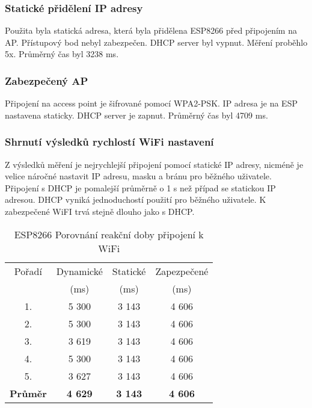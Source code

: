 \documentclass[a4paper, 12pt]{report}
\begin{document}
				\subsubsection{Statické přidělení IP adresy}
					Použita byla statická adresa, která byla přidělena ESP8266 před připojením na AP. Přístupový bod nebyl zabezpečen. DHCP server byl vypnut.
					Měření proběhlo 5x. Průměrný čas byl 3238 \si{ms}.\\

				\subsubsection{Zabezpečený AP}
						Připojení na access point je šifrované pomocí WPA2-PSK. IP adresa je na ESP nastavena staticky. DHCP server je zapnut.
						Průměrný čas byl 4709 \si{ms}.\\

				\subsubsection{Shrnutí výsledků rychlostí WiFi nastavení}
					Z výsledků měření je nejrychlejší připojení pomocí statické IP adresy, nicméně je velice náročné nastavit IP adresu, masku a bránu pro běžného uživatele. Připojení s DHCP je pomalejší průměrně o 1 \si{s} než případ se statickou IP adresou. DHCP vyniká jednoduchostí použití pro běžného uživatele. K zabezpečené WiFI trvá stejně dlouho jako s DHCP.\\ 

					\begin{table}[]
						\centering
						\caption{ESP8266 Porovnání reakční doby připojení k WiFi}
						\begin{tabular}{||c|c c c||}
							\hline
							Pořadí & Dynamické & Statické & Zapezpečené\\
							& (ms) & (ms) & (ms)\\
							\hline

							1. & 5 300 & 3 143 & 4 606\\
							2. & 5 300 & 3 143 & 4 606\\
							3. & 3 619 & 3 143 & 4 606\\
							4. & 5 300 & 3 143 & 4 606\\
							5. & 3 627 & 3 143 & 4 606\\
							\hline
							{\bf Průměr} & {\bf 4 629} & {\bf 3 143} & {\bf 4 606}\\
							\hline

						\end{tabular}
						\label{WiFi porovnání v sekundách}
					\end{table}
\end{document}
